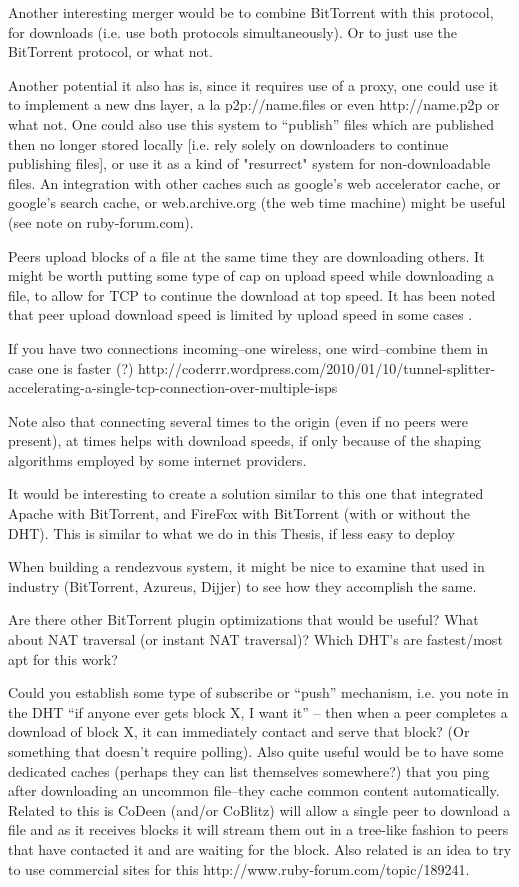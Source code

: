 Another interesting merger would be to combine BitTorrent with this protocol, for downloads (i.e. use both protocols simultaneously).  Or to just use the BitTorrent protocol, or what not.

Another potential it also has is, since it requires use of a proxy, one could use it to implement a new dns layer, a la p2p://name.files or even http://name.p2p or what not.  One could also use this system to ``publish'' files which are published then no longer stored locally [i.e. rely solely on downloaders to continue publishing files], or use it as a kind of "resurrect" system for non-downloadable files.  An integration with other caches such as google's web accelerator cache, or google's search cache, or web.archive.org (the web time machine) might be useful (see note on ruby-forum.com).

Peers upload blocks of a file at the same time they are downloading others.  It might be worth putting some type of cap on upload speed while downloading a file, to allow for TCP to continue the download at top speed.  It has been noted that peer upload download speed is limited by upload speed in some cases \cite{google_note}.

If you have two connections incoming--one wireless, one wird--combine them in case one is faster (?)
http://coderrr.wordpress.com/2010/01/10/tunnel-splitter-accelerating-a-single-tcp-connection-over-multiple-isps

Note also that connecting several times to the origin (even if no peers were present), at times helps with download speeds, if only because of the shaping algorithms employed by some internet providers.

It would be interesting to create a solution similar to this one that integrated Apache with BitTorrent, and FireFox with BitTorrent (with or without the DHT).  This is similar to what we do in this Thesis, if less easy to deploy

When building a rendezvous system, it might be nice to examine that used in industry (BitTorrent, Azureus, Dijjer) to see how they accomplish the same.

Are there other BitTorrent plugin optimizations that would be useful? What about NAT traversal (or instant NAT traversal)?  Which DHT's are fastest/most apt for this work?

Could you establish some type of subscribe or ``push'' mechanism, i.e. you note in the DHT ``if anyone ever gets block X, I want it'' -- then when a peer completes a download of block X, it can immediately contact and serve that block? (Or something that doesn't require polling).  Also quite useful would be to have some dedicated caches (perhaps they can list themselves somewhere?) that you ping after downloading an uncommon file--they cache common content automatically.  Related to this is CoDeen (and/or CoBlitz) will allow a single peer to download a file and as it receives blocks it will stream them out in a tree-like fashion to peers that have contacted it and are waiting for the block.  Also related is an idea to try to use commercial sites for this http://www.ruby-forum.com/topic/189241.

